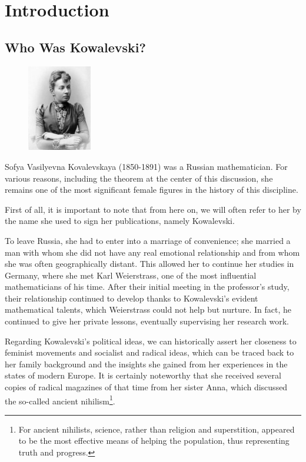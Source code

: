 \chapter{Introduction}

\section{Who Was Kowalevski?}
\begin{figure}
\centering
\includegraphics[width=0.25\textwidth]{kovalevskaya_8}
\end{figure}

Sofya Vasilyevna Kovalevskaya (1850-1891) was a Russian mathematician. For various reasons, including the theorem at the center of this discussion, she remains one of the most significant female figures in the history of this discipline.

First of all, it is important to note that from here on, we will often refer to her by the name she used to sign her publications, namely Kowalevski.

To leave Russia, she had to enter into a marriage of convenience; she married a man with whom she did not have any real emotional relationship and from whom she was often geographically distant. This allowed her to continue her studies in Germany, where she met Karl Weierstrass, one of the most influential mathematicians of his time. After their initial meeting in the professor's study, their relationship continued to develop thanks to Kowalevski's evident mathematical talents, which Weierstrass could not help but nurture. In fact, he continued to give her private lessons, eventually supervising her research work.

Regarding Kowalevski's political ideas, we can historically assert her closeness to feminist movements and socialist and radical ideas, which can be traced back to her family background and the insights she gained from her experiences in the states of modern Europe. It is certainly noteworthy that she received several copies of radical magazines of that time from her sister Anna, which discussed the so-called ancient nihilism\footnote{For ancient nihilists, science, rather than religion and superstition, appeared to be the most effective means of helping the population, thus representing truth and progress.}.

